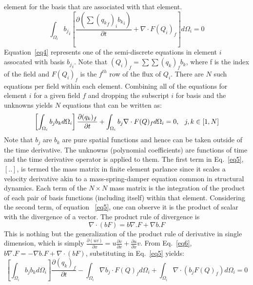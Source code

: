 \documentclass[11pt]{article}
\begin{document}
element for the basis that are associated with that element. 
\begin{equation}
  \int_{\Omega_i} {b_j}_i\left[\frac{\partial (\sum{{({q_k}_f)}_i} {b_k}_i)} {\partial t} + \nabla \cdot F(Q_i)_f\right] d \Omega_i=0
  \label{eq4}
\end{equation}
Equation~\ref{eq4} represents one of the semi-discrete equations in element $i$ assocated with
basis ${b_j}_i$. Note that $(Q_i)_f = \sum \sum (q_k)_f b_k$, where f is the index of the field and $F(Q_i)_f$ is the $f^{th}$ row
of the flux of $Q_i$. There are $N$ such equations per field within each element. Combining all of the equations
for element $i$ for a given field $f$ and dropping the subscript $i$ for basis and the unknowns yields $N$ equations
that can be written as:
\begin{equation}
  \left[\int_{\Omega_i} {b_j} {b_k} d\Omega_i\right]\frac{\partial ({q_k})_f}{\partial t} + \int_{\Omega_i} {b_j} \nabla \cdot F(Q)_f d \Omega_i = 0, \hspace{0.1in} j,k \in [1,N] 
  \label{eq5}
\end{equation}
Note that $b_j$ are $b_k$ are pure spatial functions and hence can be taken outside of the time derivative. The
unknowns (polynomial coefficients) are functions of time and the time derivative operator is applied to them. The
first term in Eq.~\ref{eq5}, $[..]$, is termed the mass matrix in finite element parlance since it scales a
velocity derivative akin to a mass-spring-damper equation common in structural dynamics. Each term of the
$N \times N$ mass matrix is the integration of the product of each pair of basis functions (including itself)
within that element. Considering the second term, of equation ~\ref{eq5}, one can observe it is the product
of scalar with the divergence of a vector. The product rule of divergence is
\begin{equation}
  \nabla \cdot (b F) = b\nabla .F + \nabla b.F
  \label{eq6}
\end{equation}
This is nothing but the generalization of the product rule of derivative in single dimension, which is simply $\frac{\partial (uv)}{\partial x} = u \frac{\partial v}{\partial x} + \frac{\partial u}{\partial x} v$.
From Eq.~\ref{eq6}, \newline $b \nabla.F = -\nabla b.F + \nabla \cdot (b F)$, substituting in Eq.~\ref{eq5} yields:
\begin{equation}
  \left[\int_{\Omega_i} {b_j} {b_k} d\Omega_i\right]\frac{\partial {(q_k)_f}}{\partial t} - \int_{\Omega_i} \nabla b_j  
\cdot F(Q)_f d \Omega_i + \int_{\Omega_i} \nabla \cdot (b_j F(Q)_f) d \Omega_i = 0
  \label{eq7}
\end{equation}
\end{document}
